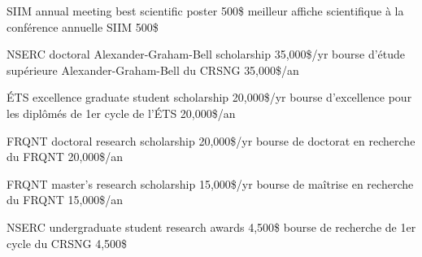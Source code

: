 \documentclass[print]{friggeri-cv}
\begin{document}

\begin{entrylist}
  \engfr
  { {{\small SIIM} annual meeting best scientific poster} {500\$} {\vspace{-3mm}}}
  { {meilleur affiche scientifique à la conférence annuelle {\small SIIM}} {500\$} {\vspace{-3mm}}}

  \engfr
  { {{\small NSERC} doctoral Alexander-Graham-Bell scholarship} {35,000\$/yr} {\vspace{-3mm}}}
  { {bourse d’étude supérieure Alexander-Graham-Bell du {\small CRSNG}} {35,000\$/an} {\vspace{-3mm}}}

  \engfr
  { {{\small ÉTS} excellence graduate student scholarship} {20,000\$/yr} {\vspace{-3mm}}}
  { {bourse d'excellence pour les diplômés de 1er cycle de l'ÉTS} {20,000\$/an} {\vspace{-3mm}}}

  \engfr
  { {{\small FRQNT} doctoral research scholarship} {20,000\$/yr} {\vspace{-3mm}}}
  { {bourse de doctorat en recherche du {\small FRQNT}} {20,000\$/an} {\vspace{-3mm}}}

  \engfr
  { {{\small FRQNT} master's research scholarship} {15,000\$/yr} {\vspace{-3mm}}}
  { {bourse de maîtrise en recherche du {\small FRQNT}} {15,000\$/an} {\vspace{-3mm}}}

  \engfr
  { {{\small NSERC} undergraduate student research awards} {4,500\$} {\vspace{-3mm}}}
  { {bourse de recherche de 1er cycle du {\small CRSNG}} {4,500\$} {\vspace{-3mm}}}
\end{entrylist}
\end{document}
